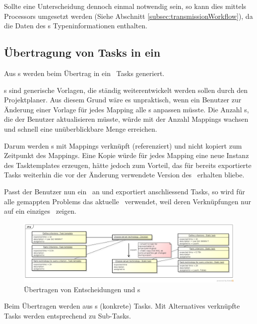 				Sollte eine Unterscheidung dennoch einmal notwendig sein, 
				so kann dies mittels Processors umgesetzt werden (Siehe Abschnitt \ref{subsec:transmissionWorkflow}), da die Daten des \dks s Typeninformationen enthalten.
				

			\subsection{Übertragung von Tasks in ein \ppt}
				Aus \ttpl s werden beim Übertrag in ein \ppt\ Tasks generiert.
								
				\ttpl s sind generische Vorlagen, die ständig weiterentwickelt werden sollen durch den Projektplaner.
				Aus diesem Grund wäre es unpraktisch, wenn ein Benutzer zur Änderung einer Vorlage für jedes Mapping alle \ttpl s anpassen müsste.
				Die Anzahl \ttpl s, die der Benutzer aktualisieren müsste, würde mit der Anzahl Mappings wachsen und schnell eine unüberblickbare Menge erreichen.
				
				Darum werden \ttpl s mit Mappings verknüpft (referenziert) und nicht kopiert zum Zeitpunkt des Mappings. 
				Eine Kopie würde für jedes Mapping eine neue Instanz des Tasktemplates erzeugen, 
				hätte jedoch zum Vorteil, das für bereits exportierte Tasks weiterhin die vor der Änderung verwendete Version des \ttpl\ erhalten bliebe.
				
				Passt der Benutzer nun ein \ttpl\ an und exportiert anschliessend Tasks, 
				so wird für alle gemappten Problems das aktuelle \ttpl\ verwendet,
				weil deren Verknüpfungen nur auf ein einziges \ttpl\ zeigen.
				
				\begin{figure}[H]
					\includegraphics[width=\textwidth]{architecture/media/img/decisionTaskRelation.png}
					\centering
					\caption{Übertragen von Entscheidungen und \ttpl s}
					\label{fig:DecisionTaskRelation}
				\end{figure}
				
				Beim Übertragen werden aus \ttpl s (konkrete) Tasks.
				Mit Alternatives verknüpfte Tasks werden entsprechend zu Sub-Tasks.
				
